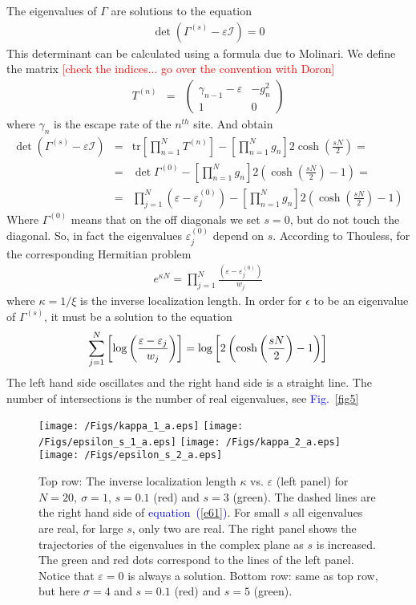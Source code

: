 \documentclass[aps,pre,floats,floatfix,fleqn,notitlepage]{revtex4-1}
\newcommand{\mylabel}[1]{\label{#1}}  %
\newcommand{\beq}{\begin{eqnarray}}
\newcommand{\eeq}{\end{eqnarray}}
\newcommand{\be}[1]{\begin{eqnarray}\ifthenelse{#1=-1}{\nonumber}{\ifthenelse{#1=0}{}{\mylabel{e#1}}}}
\newcommand{\ee}{\end{eqnarray}}
\newcommand{\Eq}[1]{\textcolor{blue}{equation~(\ref{#1})}} %
\newcommand{\Fig}[1] {\textcolor{blue}{Fig.~\ref{#1}}} %
\newcommand{\rmrk}[1]{\textcolor{red}{#1}}
\begin{document}
The eigenvalues of $\Gamma$ are solutions to the equation 
%
\beq
\det ( \Gamma^{(s) }- \varepsilon \mathcal{I})   = 0
\eeq
%
This determinant can be calculated using a formula due to Molinari. 
We define the matrix \rmrk{[check the indices... go over the convention with Doron]}
%
\beq
T^{(n)} &=& \left(
\begin{array}{cc}
 \gamma_{n-1} -\varepsilon& -g_n^2 \\
1 & 0
\end{array}
\right)
\eeq
%
where $\gamma_n$ is the escape rate of the $n^{th}$ site.
%
And obtain
\beq
\det ( \Gamma^{(s) }- \varepsilon \mathcal{I})  &=& \mathrm{tr} \left [\prod_{n=1}^N T^{(n)}  \right] - \left[\prod_{n=1}^N g_n\right]  2\cosh\left(\frac{sN}{2}\right) = \\
&=& \det  \Gamma^{(0)}  - \left[\prod_{n=1}^N g_n\right]   2\left(\cosh\left(\frac{sN}{2}\right) -1\right)= \\
&=& \prod_{j=1}^N (\varepsilon - \varepsilon_j^{(0)}) -  \left[\prod_{n=1}^N g_n\right]  2\left(\cosh\left(\frac{sN}{2}\right) -1\right)
\eeq
%
Where $\Gamma^{(0)}$ means that on the off diagonals we set $s=0$, but do not touch the diagonal.
So, in fact the eigenvalues $\varepsilon_j^{(0)}$ depend on $s$.
According to Thouless, for the corresponding Hermitian problem
%
\beq
e^{\kappa N} = \prod_{j=1}^N{\frac{  (\varepsilon - \varepsilon_j^{(0)}) }{  w_j }}
\eeq
%
where $\kappa = 1/\xi$ is the inverse localization length.
In order for $\epsilon$ to be an eigenvalue of $\Gamma^{(s)}$, it must be a solution to the equation 
%
\be{61}
\sum_{j=1}^N \left[ \log \left(\frac{\varepsilon - \varepsilon_j}{w_j}\right)\right] =
 \log \left[2\left(\cosh\left(\frac{sN}{2}\right) -1\right)\right] 
\ee
%
The left hand side oscillates and the right hand side is a straight line. 
The number of intersections is the number of real eigenvalues, see \Fig{fig5}
\begin{figure}[h]
\texttt{[image: /Figs/kappa\_1\_a.eps]}
\texttt{[image: /Figs/epsilon\_s\_1\_a.eps]}
\texttt{[image: /Figs/kappa\_2\_a.eps]}
\texttt{[image: /Figs/epsilon\_s\_2\_a.eps]}

\caption{
Top row: The inverse localization length $\kappa$ vs. $\varepsilon$ (left panel) for ${N=20, \ \sigma=1}$, $s=0.1$ (red) and $s=3$ (green). The dashed lines are the right hand side of \Eq{e61}.
For small $s$ all eigenvalues are real, for large $s$, only two are real.
The right panel shows the trajectories of the eigenvalues  in the complex plane as $s$ is increased. 
The green and red dots correspond to the lines of the left panel.
Notice that $\varepsilon=0$ is always a solution.
Bottom row: same as top row, but here $\sigma=4$ and $s=0.1$ (red) and $s=5$ (green).
}
\label{fig6}
\end{figure}
\end{document}
